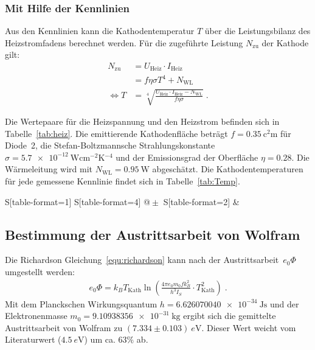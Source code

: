 \subsubsection{Mit Hilfe der Kennlinien}
Aus den Kennlinien kann die Kathodentemperatur $T$ über die Leistungsbilanz des Heizstromfadens berechnet werden. Für die zugeführte Leistung $N_{\mathrm{zu}}$ der Kathode gilt:
\begin{align}
  N_{\mathrm{zu}} &= U_{\mathrm{Heiz}} \cdot I_{\mathrm{Heiz}} \\
  &= f \eta \sigma T^4 + N_{\mathrm{WL}} \\
    \Leftrightarrow T &= \sqrt[4]{\frac{U_{\mathrm{Heiz}} \cdot I_{\mathrm{Heiz}} - N_{\mathrm{WL}}}{f \eta \sigma}} \; .
\end{align}

Die Wertepaare für die Heizspannung und den Heizstrom befinden sich in Tabelle~\ref{tab:heiz}. Die emittierende Kathodenfläche beträgt $f = \SI{0.35}{\square\centi\m}$ für Diode~2, die Stefan-Boltzmannsche Strahlungskonstante $\sigma = \SI{5.7e-12}{\watt\centi\m{^{-2}}\kelvin{^{-4}}}$ und der Emissionsgrad der Oberfläche $\eta = 0.28$. Die Wärmeleitung wird mit $N_{\mathrm{WL}} = \SI{0.95}{\watt}$ abgeschätzt.
Die Kathodentemperaturen für jede gemessene Kennlinie findet sich in Tabelle~\ref{tab:Temp}.

\begin{table}
  \centering
  \caption{Kathodentemperatur für die Messungen 1 bis 5.}
\label{tab:Temp}
  \begin{tabular}{
      S[table-format=1]
      S[table-format=4]
      @{${}\pm{}$}
      S[table-format=2]
      }
      \toprule
       &  \\
      \midrule
      \bottomrule
  \end{tabular}
\end{table}

\subsection{Bestimmung der Austrittsarbeit von Wolfram}
Die Richardson Gleichung~\eqref{equ:richardson} kann nach der Austrittsarbeit~$e_0\Phi$ umgestellt werden:
\begin{align}
  e_0\Phi = k_B T_{\mathrm{Kath}} \ln{(\frac{4 \pi e_0 m_0 f k_B^2}{h^3 I_S} \cdot T_{\mathrm{Kath}}^2 )} \; .
\end{align}
Mit dem Planckschen Wirkungsquantum $h = \SI{6.626070040e-34}{\joule\second}$ und der Elektronenmasse $m_0 = \SI{9.10938356e-31}{\kg}$ ergibt sich die gemittelte Austrittsarbeit von Wolfram zu $(7.334 \pm 0.103)~e\si{\volt}$. Dieser Wert weicht vom Literaturwert ($4.5~e\si{\volt}$) um ca. $63\%$ ab.

